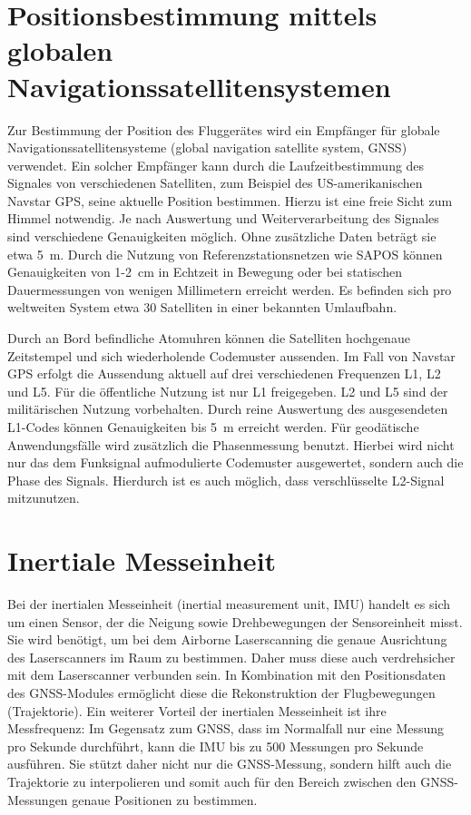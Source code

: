 \documentclass[a4paper,12pt,bibliography=totoc, listof=totoc,titlepage,pointlessnumbers]{scrreprt}
\begin{document}
\section{Positionsbestimmung mittels globalen Navigationssatellitensystemen}
\label{s:GNSS}
Zur Bestimmung der Position des Fluggerätes wird ein Empfänger für globale Navigationssatellitensysteme (global navigation satellite system, GNSS) verwendet. Ein solcher Empfänger kann durch die Laufzeitbestimmung des Signales von verschiedenen Satelliten, zum Beispiel des US-amerikanischen Navstar GPS, seine aktuelle Position bestimmen. Hierzu ist eine freie Sicht zum Himmel notwendig. Je nach Auswertung und Weiterverarbeitung des Signales sind verschiedene Genauigkeiten möglich. Ohne zu\-sätz\-liche Daten beträgt sie etwa 5~m. Durch die Nutzung von Referenzstationsnetzen wie SAPOS können Genauigkeiten von 1-2~cm in Echtzeit in Bewegung oder bei statischen Dauermessungen von wenigen Millimetern erreicht werden. Es befinden sich pro weltweiten System etwa 30 Satelliten in einer bekannten Umlaufbahn. \citep[S. 375]{Witte2006}

Durch an Bord befindliche Atomuhren können die Satelliten hochgenaue Zeitstempel und sich wiederholende Codemuster aussenden. Im Fall von Navstar GPS erfolgt die Aussendung aktuell auf drei verschiedenen Frequenzen L1, L2 und L5. Für die öffentliche Nutzung ist nur L1 freigegeben. L2 und L5 sind der militärischen Nutzung vorbehalten. Durch reine Auswertung des ausgesendeten L1-Codes können Genauigkeiten bis 5~m erreicht werden. Für geodätische Anwendungsfälle wird zu\-sätz\-lich die Phasenmessung benutzt. Hierbei wird nicht nur das dem Funksignal aufmodulierte Codemuster ausgewertet, sondern auch die Phase des Signals. Hierdurch ist es auch möglich, dass verschlüsselte L2-Signal mitzunutzen. \citep[S. 10f]{Witte2006}

\section{Inertiale Messeinheit}
\label{s:IMU}
Bei der inertialen Messeinheit (inertial measurement unit, IMU) handelt es sich um einen Sensor, der die Neigung sowie Drehbewegungen der Sensoreinheit misst. Sie wird benötigt, um bei dem Air\-borne Laser\-scan\-ning die genaue Ausrichtung des Laser\-scan\-ners im Raum zu bestimmen. Daher muss diese auch verdrehsicher mit dem Laser\-scan\-ner verbunden sein. In Kombination mit den Positionsdaten des GNSS-Modules ermöglicht diese die Rekonstruktion der Flugbewegungen (Trajektorie). Ein weiterer Vorteil der inertialen Messeinheit ist ihre Messfrequenz: Im Gegensatz zum GNSS, dass im Normalfall nur eine Messung pro Sekunde durchführt, kann die IMU bis zu 500 Messungen pro Sekunde ausführen. Sie stützt daher nicht nur die GNSS-Messung, sondern hilft auch die Trajektorie zu interpolieren und somit auch für den Bereich zwischen den GNSS-Messungen genaue Positionen zu bestimmen. \citep[S. 23ff]{beraldin}
\end{document}
